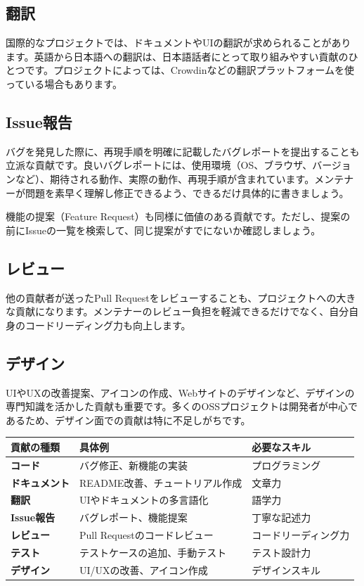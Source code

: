 \subsection{翻訳}

国際的なプロジェクトでは、ドキュメントやUIの翻訳が求められることがあります。英語から日本語への翻訳は、日本語話者にとって取り組みやすい貢献のひとつです。プロジェクトによっては、Crowdinなどの翻訳プラットフォームを使っている場合もあります。

\subsection{Issue報告}

バグを発見した際に、再現手順を明確に記載したバグレポートを提出することも立派な貢献です。良いバグレポートには、使用環境（OS、ブラウザ、バージョンなど）、期待される動作、実際の動作、再現手順が含まれています。メンテナーが問題を素早く理解し修正できるよう、できるだけ具体的に書きましょう。

機能の提案（Feature Request）も同様に価値のある貢献です。ただし、提案の前にIssueの一覧を検索して、同じ提案がすでにないか確認しましょう。

\subsection{レビュー}

他の貢献者が送ったPull Requestをレビューすることも、プロジェクトへの大きな貢献になります。メンテナーのレビュー負担を軽減できるだけでなく、自分自身のコードリーディング力も向上します。

\subsection{デザイン}

UIやUXの改善提案、アイコンの作成、Webサイトのデザインなど、デザインの専門知識を活かした貢献も重要です。多くのOSSプロジェクトは開発者が中心であるため、デザイン面での貢献は特に不足しがちです。

\begin{tabular}{|l|l|l|}
\hline
\textbf{貢献の種類} & \textbf{具体例} & \textbf{必要なスキル} \\
\hline
\textbf{コード} & バグ修正、新機能の実装 & プログラミング \\
\hline
\textbf{ドキュメント} & README改善、チュートリアル作成 & 文章力 \\
\hline
\textbf{翻訳} & UIやドキュメントの多言語化 & 語学力 \\
\hline
\textbf{Issue報告} & バグレポート、機能提案 & 丁寧な記述力 \\
\hline
\textbf{レビュー} & Pull Requestのコードレビュー & コードリーディング力 \\
\hline
\textbf{テスト} & テストケースの追加、手動テスト & テスト設計力 \\
\hline
\textbf{デザイン} & UI/UXの改善、アイコン作成 & デザインスキル \\
\hline
\end{tabular}

